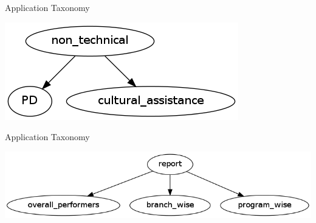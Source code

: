 \documentclass[14pt]{beamer}
\begin{document}
\begin{frame}{Application Taxonomy}
	\begin{center}
	\includegraphics[scale = 0.5]{nontech.png}
	\end{center}
\end{frame}

\begin{frame}{Application Taxonomy}
	\begin{center}
	\includegraphics[scale = 0.4]{report.png}
	\end{center}
\end{frame}
\end{document}
